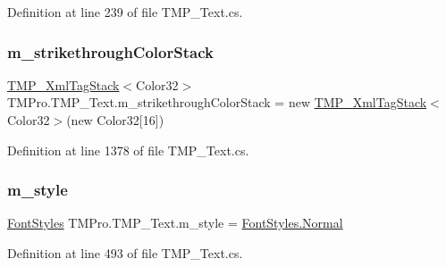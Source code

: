 Definition at line 239 of file T\+M\+P\+\_\+\+Text.\+cs.

\mbox{\label{class_t_m_pro_1_1_t_m_p___text_af18159f917aa85cb020bfe63ceeb0006}} 
\subsubsection{\texorpdfstring{m\_strikethroughColorStack}{m\_strikethroughColorStack}}
{\footnotesize\ttfamily \mbox{\hyperlink{struct_t_m_pro_1_1_t_m_p___xml_tag_stack}{T\+M\+P\+\_\+\+Xml\+Tag\+Stack}}$<$Color32$>$ T\+M\+Pro.\+T\+M\+P\+\_\+\+Text.\+m\+\_\+strikethrough\+Color\+Stack = new \mbox{\hyperlink{struct_t_m_pro_1_1_t_m_p___xml_tag_stack}{T\+M\+P\+\_\+\+Xml\+Tag\+Stack}}$<$Color32$>$(new Color32\mbox{[}16\mbox{]})\hspace{0.3cm}{\ttfamily [protected]}}



Definition at line 1378 of file T\+M\+P\+\_\+\+Text.\+cs.

\mbox{\label{class_t_m_pro_1_1_t_m_p___text_a129b38ef8dfc60ca1f1e0b1704bb663c}} 
\subsubsection{\texorpdfstring{m\_style}{m\_style}}
{\footnotesize\ttfamily \mbox{\hyperlink{namespace_t_m_pro_aedf79b6e7e2ce2b9c9ac84e790596e7c}{Font\+Styles}} T\+M\+Pro.\+T\+M\+P\+\_\+\+Text.\+m\+\_\+style = \mbox{\hyperlink{namespace_t_m_pro_aedf79b6e7e2ce2b9c9ac84e790596e7ca960b44c579bc2f6818d2daaf9e4c16f0}{Font\+Styles.\+Normal}}\hspace{0.3cm}{\ttfamily [protected]}}



Definition at line 493 of file T\+M\+P\+\_\+\+Text.\+cs.

\mbox{\label{class_t_m_pro_1_1_t_m_p___text_ab9c9bb0657a685306a3525c4b248ac4f}} 
